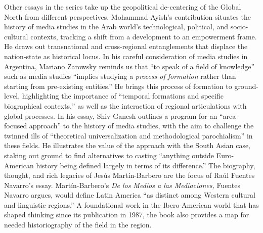 \documentclass{tufte-handout}
\begin{document}
Other essays in the series take up the geopolitical de-centering of the
Global North from different perspectives. Mohammad Ayish's contribution
situates the history of media studies in the Arab world's technological,
political, and socio-cultural contexts, tracking a shift from a
development to an empowerment frame. He draws out transnational and
cross-regional entanglements that displace the nation-state as
historical locus. In his careful consideration of media studies in
Argentina, Mariano Zarowsky reminds us that ``to speak of a field of
knowledge'' such as media studies ``implies studying a \emph{process of
formation} rather than starting from pre-existing entities.'' He brings
this process of formation to ground-level, highlighting the importance
of ``temporal formations and specific biographical contexts,'' as well
as the interaction of regional articulations with global processes. In
his essay, Shiv Ganesh outlines a program for an ``area-focused
approach'' to the history of media studies, with the aim to challenge
the twinned ills of ``theoretical universalization and methodological
parochialism'' in these fields. He illustrates the value of the approach
with the South Asian case, staking out ground to find alternatives to
casting ``anything outside Euro-American history being defined largely
in terms of its difference.'' The biography, thought, and rich legacies
of Jesús Martín-Barbero are the focus of Raúl Fuentes Navarro's essay.
Martín-Barbero's \emph{De los Medios a las Mediaciones,} Fuentes Navarro
argues, would define Latin America ``as distinct among Western cultural
and linguistic regions.'' A foundational work in the Ibero-American
world that has shaped thinking since its publication in 1987, the book
also provides a map for needed historiography of the field in the
region.
\end{document}
